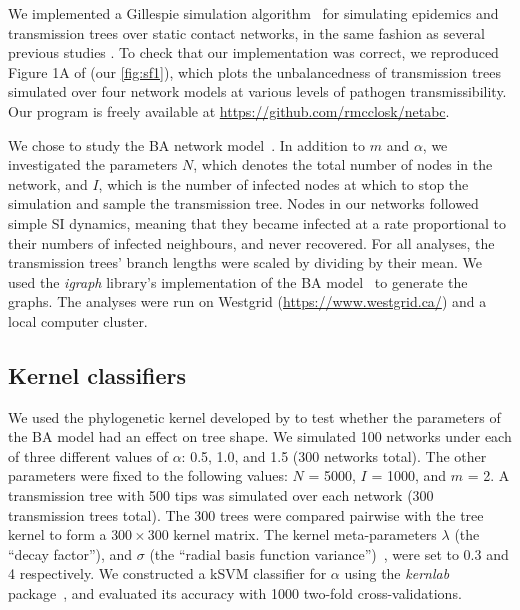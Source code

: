 \documentclass[12pt]{article}\usepackage[]{graphicx}\usepackage[]{color}
\newcommand{\software}[1]{\textit{#1}}
\begin{document}
We implemented a Gillespie simulation algorithm~\autocite{gillespie1976general}
for simulating epidemics and transmission trees over static contact networks,
in the same fashion as several previous studies
\autocite[\textit{e.g.}][]{o2010contact, robinson2013dynamics,
leventhal2012inferring, groendyke2011bayesian, goodreau2006assessing}. To check
that our implementation was correct, we reproduced Figure 1A of
\textcite{leventhal2012inferring} (our \cref{fig:sf1}), which plots the
unbalancedness of transmission trees simulated over four network models at
various levels of pathogen transmissibility. Our program is freely available at
\url{https://github.com/rmcclosk/netabc}.

We chose to study the \gls{BA} network model~\autocite{barabasi1999emergence}.
In addition to $m$ and $\alpha$, we investigated the parameters $N$, which
denotes the total number of nodes in the network, and $I$, which is the number
of infected nodes at which to stop the simulation and sample the transmission
tree. Nodes in our networks followed simple \gls{SI} dynamics, meaning that
they became infected at a rate proportional to their numbers of infected
neighbours, and never recovered. For all analyses, the transmission trees'
branch lengths were scaled by dividing by their mean. We used the 
\software{igraph} library's implementation of the \gls{BA}
model~\autocite{csardi2006igraph} to generate the graphs. The analyses were run
on Westgrid (\url{https://www.westgrid.ca/}) and a local computer cluster.

\subsection*{Kernel classifiers}

We used the phylogenetic kernel developed by \textcite{poon2013mapping} to test
whether the parameters of the \gls{BA} model had an effect on tree shape. We
simulated 100 networks under each of three different values of $\alpha$: 0.5,
1.0, and 1.5 (300 networks total). The other parameters were fixed to the
following values: $N$ = 5000, $I$ = 1000, and $m$ = 2. A transmission tree with
500 tips was simulated over each network (300 transmission trees total). The
300 trees were compared pairwise with the tree kernel to form a $300 \times
300$ kernel matrix. The kernel meta-parameters $\lambda$ (the ``decay
factor''), and $\sigma$ (the ``radial basis function
variance'')~\autocite[see][]{poon2013mapping}, were set to 0.3 and 4
respectively. We constructed a \gls{kSVM} classifier for $\alpha$ using the
\software{kernlab} package~\autocite{karatzoglou2004kernlab}, and evaluated its
accuracy with 1000 two-fold cross-validations.
\end{document}
